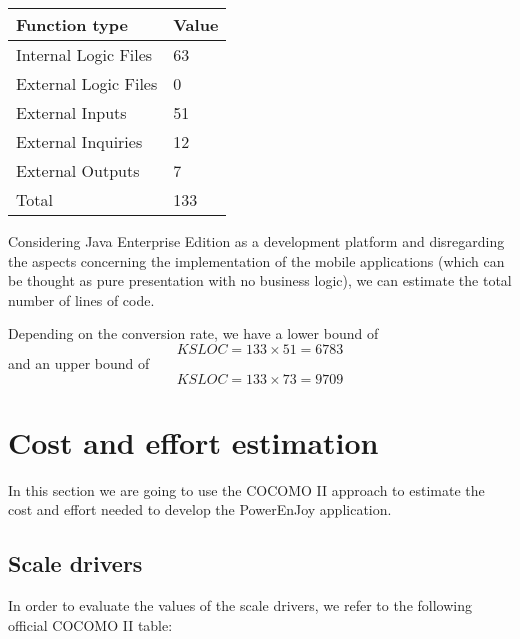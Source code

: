 \begin{table}[H]
	\centering
	\begin{tabular}{|l|l|}
		\hline
		Function type & Value \\
		\hline
		Internal Logic Files & 63 \\
		External Logic Files & 0 \\
		External Inputs & 51 \\
		External Inquiries & 12 \\
		External Outputs & 7 \\
		\hline
		Total & 133 \\
		\hline
	\end{tabular}
\end{table}
Considering Java Enterprise Edition as a development platform and disregarding the aspects concerning the implementation of the mobile applications (which can be thought as pure presentation with no business logic), we can estimate the total number of lines of code.

Depending on the conversion rate, we have a lower bound of \[KSLOC = 133 \times 51 = 6783\] and an upper bound of \[KSLOC = 133 \times 73 = 9709\]

\section{Cost and effort estimation}
In this section we are going to use the COCOMO II approach to estimate the
cost and effort needed to develop the PowerEnJoy application.

\subsection{Scale drivers}
In order to evaluate the values of the scale drivers, we refer to the following official COCOMO II table:


